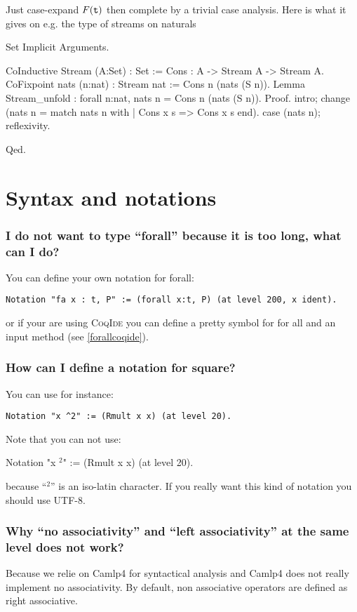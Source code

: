 \documentclass[a4paper,pdftex]{article}
\def\Question#1{\stepcounter{question}\subsubsection{#1}}
\def\CoqIde{\textsc{CoqIde}}
\begin{document}
Just case-expand $F({\tt t})$ then complete by a trivial case analysis.
Here is what it gives on e.g. the type of streams on naturals

\begin{coq_eval}
Set Implicit Arguments.
\end{coq_eval}
\begin{coq_example}
CoInductive Stream (A:Set) : Set :=
  Cons : A -> Stream A -> Stream A.
CoFixpoint nats (n:nat) : Stream nat := Cons n (nats (S n)).
Lemma Stream_unfold :
   forall n:nat, nats n = Cons n (nats (S n)).
Proof.
  intro;
  change (nats n = match nats n with
                  | Cons x s => Cons x s
                  end).
  case (nats n); reflexivity.
\end{coq_example}
\begin{coq_example*}
Qed.
\end{coq_example*}



\section{Syntax and notations}

\Question{I do not want to type ``forall'' because it is too long, what can I do?}

You can define your own notation for forall:
\begin{verbatim}
Notation "fa x : t, P" := (forall x:t, P) (at level 200, x ident).
\end{verbatim}
or if your are using {\CoqIde} you can define a pretty symbol for for all and an input method (see \ref{forallcoqide}).



\Question{How can I define a notation for square?}

You can use for instance:
\begin{verbatim}
Notation "x ^2" := (Rmult x x) (at level 20).
\end{verbatim}
Note that you can not use:
\begin{tt}
Notation "x $^2$" := (Rmult x x) (at level 20).
\end{tt}
because ``$^2$'' is an iso-latin character. If you really want this kind of notation you should use UTF-8.


\Question{Why ``no associativity'' and  ``left associativity'' at the same level does not work?}

Because we relie on Camlp4 for syntactical analysis and Camlp4 does not really
implement no associativity. By default, non associative operators are defined
as right associative.
\end{document}
